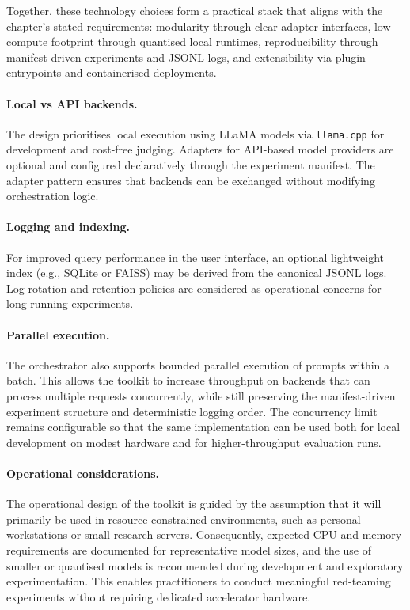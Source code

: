 Together, these technology choices form a practical stack that aligns with the chapter's stated requirements: modularity through clear adapter interfaces, low compute footprint through quantised local runtimes, reproducibility through manifest-driven experiments and JSONL logs, and extensibility via plugin entrypoints and containerised deployments.

\paragraph{Local vs API backends.}
The design prioritises local execution using LLaMA models via \texttt{llama.cpp} for development and cost-free judging.
Adapters for API-based model providers are optional and configured declaratively through the experiment manifest.
The adapter pattern ensures that backends can be exchanged without modifying orchestration logic.

\paragraph{Logging and indexing.}
For improved query performance in the user interface, an optional lightweight index (e.g., SQLite or FAISS) may be derived from the canonical JSONL logs.
Log rotation and retention policies are considered as operational concerns for long-running experiments.

\paragraph{Parallel execution.}
The orchestrator also supports bounded parallel execution of prompts within a batch.
This allows the toolkit to increase throughput on backends that can process multiple requests concurrently, while still preserving the manifest-driven experiment structure and deterministic logging order.
The concurrency limit remains configurable so that the same implementation can be used both for local development on modest hardware and for higher-throughput evaluation runs.

\paragraph{Operational considerations.}
The operational design of the toolkit is guided by the assumption that it will primarily be used in resource-constrained environments, such as personal workstations or small research servers.
Consequently, expected CPU and memory requirements are documented for representative model sizes, and the use of smaller or quantised models is recommended during development and exploratory experimentation.
This enables practitioners to conduct meaningful red-teaming experiments without requiring dedicated accelerator hardware.

